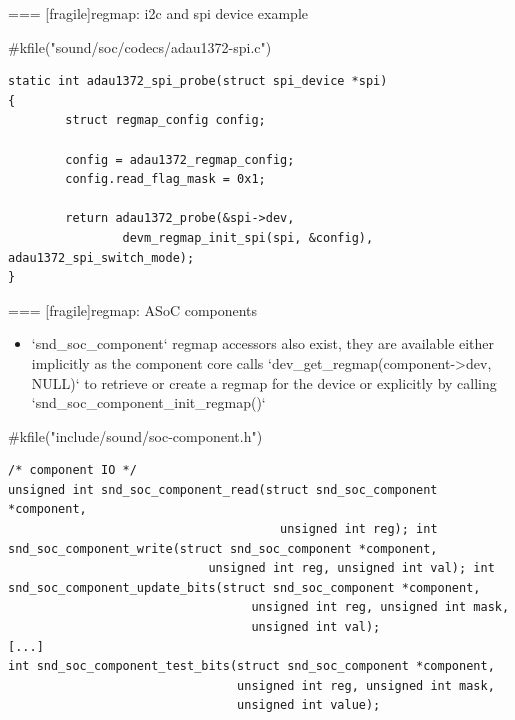 === [fragile]{regmap: i2c and spi device example}
  \begin{block}{#kfile("sound/soc/codecs/adau1372-spi.c")}
  \fontsize{8}{8}\selectfont
    \begin{verbatim}
static int adau1372_spi_probe(struct spi_device *spi)
{
        struct regmap_config config;

        config = adau1372_regmap_config;
        config.read_flag_mask = 0x1;

        return adau1372_probe(&spi->dev,
                devm_regmap_init_spi(spi, &config), adau1372_spi_switch_mode);
}
    \end{verbatim}
  \end{block}


=== [fragile]{regmap: ASoC components}
  \begin{itemize}
  \item `snd_soc_component` regmap accessors also exist, they are
    available either implicitly as the component core calls
    `dev_get_regmap(component->dev, NULL)` to retrieve or create
    a regmap for the device or explicitly by calling
    `snd_soc_component_init_regmap()`
  \end{itemize}
  \begin{block}{#kfile("include/sound/soc-component.h")}
  \fontsize{9}{9}\selectfont
    \begin{verbatim}
/* component IO */
unsigned int snd_soc_component_read(struct snd_soc_component *component,
                                      unsigned int reg); int snd_soc_component_write(struct snd_soc_component *component,
                            unsigned int reg, unsigned int val); int snd_soc_component_update_bits(struct snd_soc_component *component,
                                  unsigned int reg, unsigned int mask,
                                  unsigned int val);
[...]
int snd_soc_component_test_bits(struct snd_soc_component *component,
                                unsigned int reg, unsigned int mask,
                                unsigned int value);
    \end{verbatim}
  \end{block}

